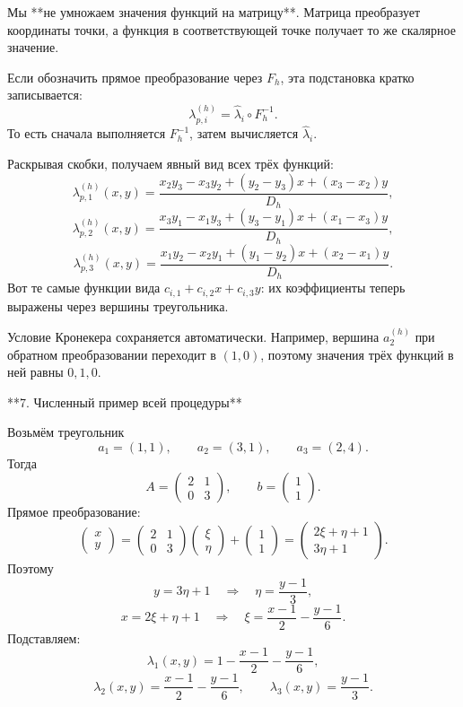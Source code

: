 \documentclass[a4paper,14pt]{extarticle}
\begin{document}
	Мы **не умножаем значения функций на матрицу**. Матрица преобразует координаты точки, а функция в соответствующей точке получает то же скалярное значение.
	
	Если обозначить прямое преобразование через \(F_h\), эта подстановка кратко записывается:
	\[
	\lambda_{p,i}^{(h)}=\widehat\lambda_i\circ F_h^{-1}.
	\]
	То есть сначала выполняется \(F_h^{-1}\), затем вычисляется \(\widehat\lambda_i\).
	
	Раскрывая скобки, получаем явный вид всех трёх функций:
	\[
	\boxed{
		\lambda_{p,1}^{(h)}(x,y)=
		\frac{x_2y_3-x_3y_2+(y_2-y_3)x+(x_3-x_2)y}{D_h},
	}
	\]
	\[
	\boxed{
		\lambda_{p,2}^{(h)}(x,y)=
		\frac{x_3y_1-x_1y_3+(y_3-y_1)x+(x_1-x_3)y}{D_h},
	}
	\]
	\[
	\boxed{
		\lambda_{p,3}^{(h)}(x,y)=
		\frac{x_1y_2-x_2y_1+(y_1-y_2)x+(x_2-x_1)y}{D_h}.
	}
	\]
	Вот те самые функции вида \(c_{i,1}+c_{i,2}x+c_{i,3}y\): их коэффициенты теперь выражены через вершины треугольника.
	
	Условие Кронекера сохраняется автоматически. Например, вершина \(a_2^{(h)}\) при обратном преобразовании переходит в \((1,0)\), поэтому значения трёх функций в ней равны \(0,1,0\).
	
	**7. Численный пример всей процедуры**
	
	Возьмём треугольник
	\[
	a_1=(1,1),\qquad a_2=(3,1),\qquad a_3=(2,4).
	\]
	Тогда
	\[
	A=
	\begin{pmatrix}2&1\\0&3\end{pmatrix},
	\qquad
	b=\begin{pmatrix}1\\1\end{pmatrix}.
	\]
	Прямое преобразование:
	\[
	\begin{pmatrix}x\\y\end{pmatrix}
	=
	\begin{pmatrix}2&1\\0&3\end{pmatrix}
	\begin{pmatrix}\xi\\\eta\end{pmatrix}
	+\begin{pmatrix}1\\1\end{pmatrix}
	=
	\begin{pmatrix}2\xi+\eta+1\\3\eta+1\end{pmatrix}.
	\]
	Поэтому
	\[
	y=3\eta+1
	\quad\Longrightarrow\quad
	\eta=\frac{y-1}{3},
	\]
	\[
	x=2\xi+\eta+1
	\quad\Longrightarrow\quad
	\xi=\frac{x-1}{2}-\frac{y-1}{6}.
	\]
	Подставляем:
	\[
	\lambda_1(x,y)
	=1-\frac{x-1}{2}-\frac{y-1}{6},
	\]
	\[
	\lambda_2(x,y)
	=\frac{x-1}{2}-\frac{y-1}{6},
	\qquad
	\lambda_3(x,y)=\frac{y-1}{3}.
	\]
	
\end{document}
